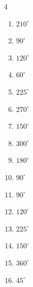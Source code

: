 \begin{multicols}{4}
\begin{enumerate}
  \item $\displaystyle 210^{\circ}$

  \item $\displaystyle 90^{\circ}$

  \item $\displaystyle 120^{\circ}$

  \item $\displaystyle 60^{\circ}$

  \item $\displaystyle 225^{\circ}$

  \item $\displaystyle 270^{\circ}$

\columnbreak %

\resetques

  \item $\displaystyle 150^{\circ}$

  \item $\displaystyle 300^{\circ}$

  \item $\displaystyle 180^{\circ}$
        \phantom{$\displaystyle =\pi$}

  \item $\displaystyle 90^{\circ}$

  \item $\displaystyle 90^{\circ}$

  \item $\displaystyle 120^{\circ}$

  \item $\displaystyle 225^{\circ}$

  \item $\displaystyle 150^{\circ}$

  \item $\displaystyle 360^{\circ}$
        \phantom{$\displaystyle =2\pi$}

  \item $\displaystyle 45^{\circ}$


\end{enumerate}
\end{multicols}
